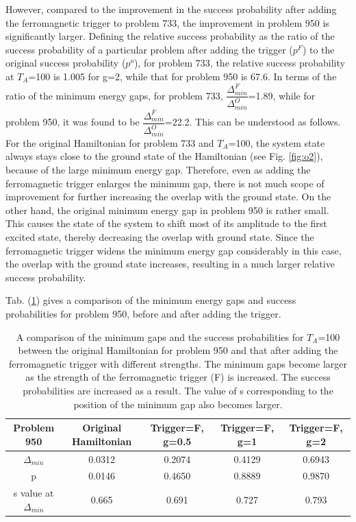 \documentclass[../main.tex]{subfiles}
\begin{document}
However, compared to the improvement in the success probability after adding the ferromagnetic trigger to problem 733, the improvement in problem 950 is significantly larger. Defining the relative success probability as the ratio of the success probability of a particular problem after adding the trigger ($p^F$) to the original success probability ($p^o$), for problem 733, the relative success probability at $T_A$=100 is 1.005 for g=2, while that for problem 950 is 67.6. In terms of the ratio of the minimum energy gaps, for problem 733, $\dfrac{\Delta_{min}^F}{\Delta_{min}^O}$=1.89, while for problem 950, it was found to be $\dfrac{\Delta_{min}^F}{\Delta_{min}^O}$=22.2. This can be understood as follows. For the original Hamiltonian for problem 733 and $T_A$=100, the system state always stays close to the ground state of the Hamiltonian (see Fig. \ref{fig:o2}), because of the large minimum energy gap. Therefore, even as adding the ferromagnetic trigger enlarges the minimum gap, there is not much scope of improvement for further increasing the overlap with the ground state. On the other hand, the original minimum energy gap in problem 950 is rather small. This causes the state of the system to shift most of its amplitude to the first excited state, thereby decreasing the overlap with ground state. Since the ferromagnetic trigger widens the minimum energy gap considerably in this case, the overlap with the ground state increases, resulting in a much larger relative success probability. 

Tab. (\ref{tab:f2}) gives a comparison of the minimum energy gaps and success probabilities for problem 950, before and after adding the trigger.
\begin{table}[H]
\centering
\renewcommand{\arraystretch}{1.3}
\begin{tabular}{|c|c|c|c|c|}
\hline 
Problem 950 & Original Hamiltonian & Trigger=F, g=0.5 & Trigger=F, g=1 & Trigger=F, g=2 \\ 
\hline 
$\Delta_{min}$ & 0.0312 & 0.2074 & 0.4129 & 0.6943 \\ 
\hline 
p & 0.0146 & 0.4650 & 0.8889 & 0.9870 \\ 
\hline 
s value at $\Delta_{min}$ & 0.665 & 0.691 & 0.727 & 0.793 \\
\hline

\end{tabular} 
\caption{A comparison of the minimum gaps and the success probabilities for $T_A$=100 between the original Hamiltonian for problem 950 and that after adding the  ferromagnetic trigger with different strengths. The minimum gaps become larger as the strength of the ferromagnetic trigger (F) is increased. The success probabilities are increased as a result. The value of s corresponding to the position of the minimum gap also becomes larger.}
\label{tab:f2}
\end{table}
\end{document}
